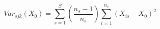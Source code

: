 

\[
Var_{sjk} (X_0) = \sum_{s=1}^{S}{(\frac{n_s - 1}{n_s})} \sum_{i=1}^{n_s}{(X_{is} - X_0)^{2}}

\]



